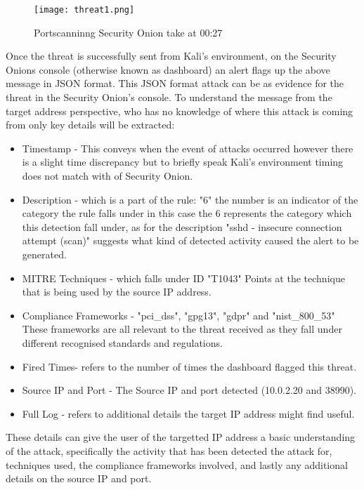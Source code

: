 \documentclass[12pt]{article}
\begin{document}
		\begin{center}
		\begin{figure}[H]
			\centering
			\texttt{[image: threat1.png]}
			\caption{Portscanninng Security Onion take at 00:27 } 
			\label{fig:attack1}
		\end{figure}
		\end{center}
		Once the threat is successfully sent from Kali's environment, on the Security Onions console (otherwise known as dashboard) an alert flags up the above message in JSON format. This JSON format attack can be as evidence for the threat in the Security Onion's console. To understand the message from the target address perspective, who has no knowledge of where this attack is coming from only key details will be extracted:
		\begin{itemize}
		\item Timestamp - This conveys when the event of attacks occurred however there is a slight time discrepancy but to briefly speak Kali's environment timing does not match with of Security Onion.
		\item Description -  which is a part of the rule: "6" the number is an indicator of the category the rule falls under in this case the 6 represents the category which this detection fall under, as for the description "sshd - insecure connection attempt (scan)" suggests what kind of detected activity caused the alert to be generated.
		\item MITRE Techniques - which falls under ID "T1043" Points at the technique that is being used by the source IP address.
		\item Compliance Frameworks - "pci\_dss", "gpg13", "gdpr" and "nist\_800\_53" These frameworks are all relevant to the threat received as they fall under different recognised standards and regulations.
		\item Fired Times- refers to the number of times the dashboard flagged this threat.
		\item Source IP and Port - The Source IP and port detected (10.0.2.20 and 38990).
		\item Full Log - refers to additional details the target IP address might find useful.
		
		\end{itemize}
		These details can give the user of the targetted IP address a basic understanding of the attack, specifically the activity that has been detected the attack for, techniques used, the compliance frameworks involved, and lastly any additional details on the source IP and port.
		
\end{document}
